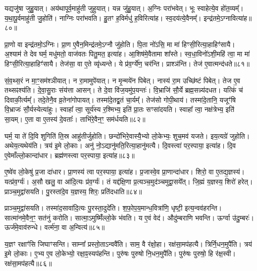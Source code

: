 यद्यजु॑षा जुहु॒यात्। 
अय॑थापूर्व॒माहु॑ती जुहुयात्। 
यन्न जु॑हु॒यात्। 
अ॒ग्निः परा॑भवेत्। 
भूः स्वाहेत्ये॒व हो॑त॒व्यम्᳚। 
य॒था॒पू॒र्वमाहु॑ती जु॒होति॑। 
नाग्निः परा॑भवति। 
हु॒तꣳ ह॒विर्मधु॑ ह॒विरित्या॑ह। 
स्व॒दय॑त्ये॒वैनम्᳚। 
इन्द्र॑तमे॒ऽग्नावित्या॑ह॥८०॥

प्रा॒णो वा इन्द्र॑तमो॒ऽग्निः। 
प्रा॒ण ए॒वैन॒मिन्द्र॑तमे॒ऽग्नौ जु॑होति। 
पि॒ता नो॑ऽसि॒ मा मा॑ हिꣳसी॒रित्या॒हाहिꣳ॑सायै। 
अ॒श्याम॑ ते देव घर्म॒ मधु॑मतो॒ वाज॑वतः पितु॒मत॒ इत्या॑ह। 
आ॒शिष॑मे॒वैतामा शा᳚स्ते। 
स्व॒धा॒विनो॑ऽशी॒महि॑ त्वा॒ मा मा॑ हिꣳसी॒रित्या॒हाहिꣳ॑सायै। 
तेज॑सा॒ वा ए॒ते व्यृ॑ध्यन्ते। 
ये प्र॑व॒र्ग्ये॑ण॒ चर॑न्ति। 
प्राश्ञ॑न्ति। 
तेज॑ ए॒वात्मन्द॑धते॥८१॥

सं॒व॒थ्स॒रं न मा॒ꣳ॒सम॑श्ञीयात्। 
न रा॒मामुपे॑यात्। 
न मृ॒न्मये॑न पिबेत्। 
नास्य॑ रा॒म उच्छि॑ष्टं पिबेत्। 
तेज ए॒व तथ्सꣴश्य॑ति। 
दे॒वा॒सु॒राः संय॑त्ता आसन्। 
ते दे॒वा वि॑ज॒यमु॑प॒यन्तः॑। 
वि॒भ्राजि॑ सौ॒र्ये ब्रह्म॒सन्न्य॑दधत। 
यत्किं च॑ दिवाकी॒र्त्यम्᳚। 
तदे॒तेनै॒व व्र॒तेना॑गोपायत्। 
तस्मा॑दे॒तद्व्र॒तं चा॒र्यम्᳚। 
तेज॑सो गोपी॒थाय॑। 
तस्मा॑दे॒तानि॒ यजूꣳ॑षि वि॒भ्राजः॑ सौ॒र्यस्येत्या॑हुः। 
स्वाहा᳚ त्वा॒ सूर्य॑स्य र॒श्मिभ्य॒ इति॑ प्रा॒तः सꣳसा॑दयति। 
स्वाहा᳚ त्वा॒ नक्ष॑त्रेभ्य॒ इति॑ सा॒यम्। 
ए॒ता वा ए॒तस्य॑ दे॒वताः᳚। 
ताभि॑रे॒वैन॒ꣳ॒ सम॑र्धयति॥८२॥

घर्म॒ या ते॑ दि॒वि शुगिति॑ ति॒स्र आहु॑तीर्जुहोति। 
छन्दो॑भिरे॒वास्यै॒भ्यो लो॒केभ्यः॒ शुच॒मव॑ यजते। 
इय॒त्यग्रे॑ जुहोति। 
अथेय॒त्यथेय॑ति। 
त्रय॑ इ॒मे लो॒काः। 
अनु॑ नो॒ऽद्यानु॑\-मति॒रित्या॒हानु॑मत्यै। 
दि॒वस्त्वा॑ पर॒स्पाया॒ इत्या॑ह। 
दि॒व ए॒वेमाँल्लो॒कान्दा॑धार। 
ब्रह्म॑णस्त्वा पर॒स्पाया॒ इत्या॑ह॥८३॥

ए॒ष्वे॑व लो॒केषु॑ प्र॒जा दा॑धार। 
प्रा॒णस्य॑ त्वा पर॒स्पाया॒ इत्या॑ह। 
प्र॒जास्वे॒व प्रा॒णान्दा॑धार। 
शिरो॒ वा ए॒तद्य॒ज्ञस्य॑। 
यत्प्र॑व॒र्ग्यः॑। 
अ॒सौ खलु॒ वा आ॑दि॒त्यः प्र॑व॒र्ग्यः॑। 
तं यद्द॑क्षि॒णा प्र॒त्यञ्च॒मुद॑ञ्चमुद्वा॒सये᳚त्। 
जि॒ह्मं य॒ज्ञस्य॒ शिरो॑ हरेत्। 
प्राञ्च॒मुद्वा॑सयति। 
पु॒रस्ता॑दे॒व य॒ज्ञस्य॒ शिरः॒ प्रति॑दधाति॥८४॥

प्राञ्च॒मुद्वा॑सयति। 
तस्मा॑द॒सावा॑दि॒त्यः पु॒रस्ता॒दुदे॑ति। 
श॒फो॒प॒य॒\-मान्ध॒वित्रा॑णि॒ धृष्टी॒ इत्य॒न्वव॑हरन्ति। 
सात्मा॑नमे॒वैन॒ꣳ॒ सत॑नुं करोति। 
सात्मा॒ऽमुष्मिँ॑ल्लो॒के भ॑वति। 
य ए॒वं वेद॑। 
औदु॑म्बराणि भवन्ति। 
ऊर्ग्वा उ॑दु॒म्बरः॑। 
ऊर्ज॑मे॒वाव॑रुन्धे। 
वर्त्म॑ना॒ वा अ॒न्वित्य॑॥८५॥

य॒ज्ञꣳ रक्षाꣳ॑सि जिघाꣳसन्ति। 
साम्ना᳚ प्रस्तो॒ताऽन्ववै॑ति। 
साम॒ वै र॑क्षो॒हा। 
रक्ष॑सा॒मप॑हत्यै। 
त्रिर्नि॒धन॒मुपै॑ति। 
त्रय॑ इ॒मे लो॒काः। 
ए॒भ्य ए॒व लो॒केभ्यो॒ रक्षा॒ꣴ॒स्यप॑हन्ति। 
पुरु॑षः पुरुषो नि॒धन॒मुपै॑ति। 
पुरु॑षः पुरुषो॒ हि र॑क्ष॒स्वी। 
रक्ष॑सा॒मप॑हत्यै॥८६॥

